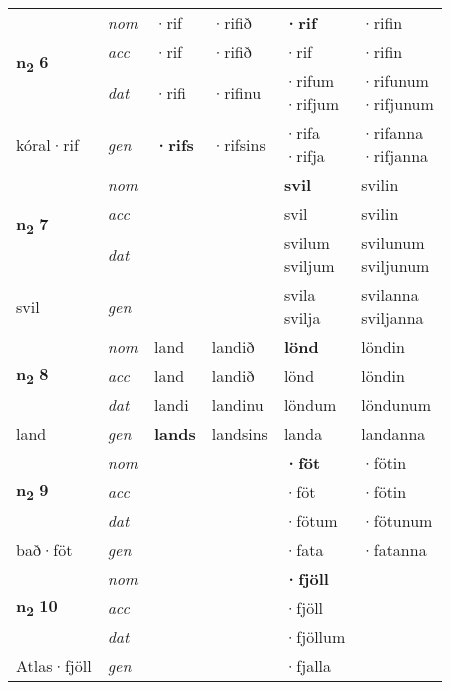 \begin{longtable}[l]{X>{\footnotesize\itshape}XXXXX}
\multirow{3}{*}{{{\textbf{n{\textsubscript{2}}} \Large{\textbf{6}}}}} & nom & ·rif & ·rifið & \textbf{·rif} & ·rifin \\*
 & acc & ·rif & ·rifið & ·rif & ·rifin \\*
 & dat & ·rifi & ·rifinu & \specialcell{·rifum\\  ·rifjum} & \specialcell{·rifunum\\  ·rifjunum} \\*
 {\footnotesize{kóral\allowbreak ·rif}} & gen & \textbf{·rifs} & ·rifsins & \specialcell{·rifa\\  ·rifja} & \specialcell{·rifanna\\  ·rifjanna} \\
\cmidrule{1-6}

\multirow{3}{*}{{{\textbf{n{\textsubscript{2}}} \Large{\textbf{7}}}}} & nom &  &  & \textbf{svil} & svilin \\*
 & acc &  &  & svil & svilin \\*
 & dat &  &  & \specialcell{svilum\\ sviljum} & \specialcell{svilunum\\ sviljunum} \\*
 {\footnotesize{svil}} & gen & \textbf{} &  & \specialcell{svila\\ svilja} & \specialcell{svilanna\\ sviljanna} \\
\cmidrule{1-6}

\multirow{3}{*}{{{\textbf{n{\textsubscript{2}}} \Large{\textbf{8}}}}} & nom & land & landið & \textbf{lönd} & löndin \\*
 & acc & land & landið & lönd & löndin \\*
 & dat & landi & landinu & löndum & löndunum \\*
 {\footnotesize{land}} & gen & \textbf{lands} & landsins & landa & landanna \\
\cmidrule{1-6}

\multirow{3}{*}{{{\textbf{n{\textsubscript{2}}} \Large{\textbf{9}}}}} & nom &  &  & \textbf{·föt} & ·fötin \\*
 & acc &  &  & ·föt & ·fötin \\*
 & dat &  &  & ·fötum & ·fötunum \\*
 {\footnotesize{bað\allowbreak ·föt}} & gen & \textbf{} &  & ·fata & ·fatanna \\
\cmidrule{1-6}

\multirow{3}{*}{{{\textbf{n{\textsubscript{2}}} \Large{\textbf{10}}}}} & nom &  &  & \textbf{·fjöll} &  \\*
 & acc &  &  & ·fjöll &  \\*
 & dat &  &  & ·fjöllum &  \\*
 {\footnotesize{Atlas\allowbreak ·fjöll}} & gen & \textbf{} &  & ·fjalla &  \\
\cmidrule{1-6}


\end{longtable}
